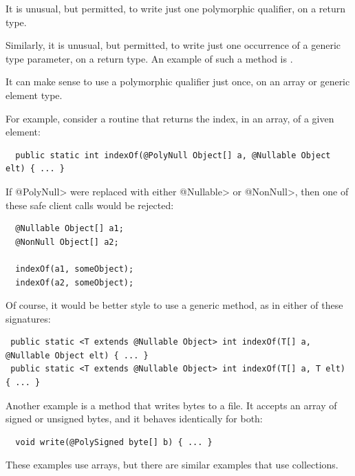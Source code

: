 
It is unusual, but permitted, to write just one polymorphic qualifier, on a return type.

Similarly, it is unusual, but permitted, to write just one
occurrence of a generic type parameter, on a return type.  An example of
such a method is
.



It can make sense to use a polymorphic qualifier just once, on an array or
generic element type.

For example, consider a routine that returns the index, in an array, of a
given element:

\begin{Verbatim}
  public static int indexOf(@PolyNull Object[] a, @Nullable Object elt) { ... }
\end{Verbatim}

If \<@PolyNull> were replaced with either \<@Nullable> or \<@NonNull>, then
one of these safe client calls would be rejected:

\begin{Verbatim}
  @Nullable Object[] a1;
  @NonNull Object[] a2;

  indexOf(a1, someObject);
  indexOf(a2, someObject);
\end{Verbatim}

Of course, it would be better style to use a generic method, as in either
of these signatures:

\begin{Verbatim}
 public static <T extends @Nullable Object> int indexOf(T[] a, @Nullable Object elt) { ... }
 public static <T extends @Nullable Object> int indexOf(T[] a, T elt) { ... }
\end{Verbatim}


Another example is a method that writes bytes to a file.  It accepts an
array of signed or unsigned bytes, and it behaves identically for both:

\begin{Verbatim}
  void write(@PolySigned byte[] b) { ... }
\end{Verbatim}


These examples use arrays, but there are similar examples that
use collections.


